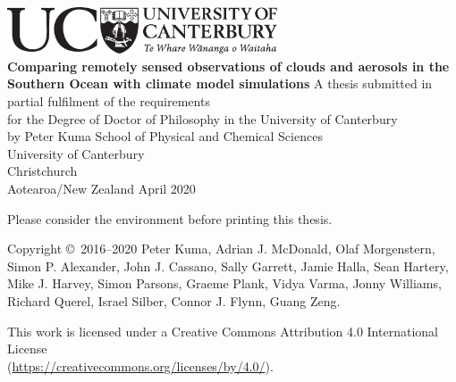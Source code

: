 \thispagestyle{empty}
\begin{center}
\centering
\includegraphics[width=0.6\textwidth]{fig/UCBlack_LAN_Te_Reo.pdf}\\
\vfill
\huge
\sffamily
\textbf{Comparing remotely sensed observations of clouds and
aerosols in the Southern Ocean with climate model
simulations}
\normalfont
\vfill
\Large
A thesis submitted in partial fulfilment of the requirements\\
for the Degree of Doctor of Philosophy
in the University of Canterbury\\
by Peter Kuma %
\vfill
School of Physical and Chemical Sciences\\
University of Canterbury\\
Christchurch\\
Aotearoa/New Zealand
\vfill
April 2020
\end{center}
\clearpage
\thispagestyle{empty}
\normalfont
\null
\vfill
\noindent
\begin{center}
\large
\noindent
Please consider the environment before printing this thesis.
\end{center}
\vfill
\noindent
Copyright \copyright\ 2016--2020 Peter Kuma,
Adrian J. McDonald, Olaf Morgenstern, Simon P. Alexander, John J. Cassano,
Sally Garrett, Jamie Halla, Sean Hartery, Mike J. Harvey, Simon Parsons,
Graeme Plank, Vidya Varma, Jonny Williams, Richard Querel, Israel Silber, Connor J. Flynn,
Guang Zeng.\\
\par
\noindent
This work is licensed under a Creative Commons Attribution 4.0 International
License\\ (\href{https://creativecommons.org/licenses/by/4.0/}{https://creativecommons.org/licenses/by/4.0/}).
\clearpage
